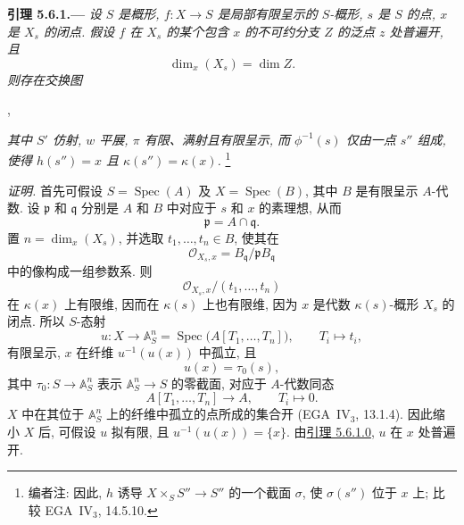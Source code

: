 
\medskip
{}\label{lem:sga3-VIB-5.6.1}%
\noindent\textbf{引理 5.6.1.---}
\emph{设 \(S\) 是概形, \(f:X\to S\) 是局部有限呈示的 \(S\)-概形,
\(s\) 是 \(S\) 的点, \(x\) 是 \(X_s\) 的闭点.
假设 \(f\) 在 \(X_s\) 的某个包含 \(x\) 的不可约分支
\(Z\) 的泛点 \(z\) 处普遍开, 且}
\[
  \dim_x(X_s)=\dim Z.
\]
\emph{则存在交换图}
\begin{center}
  \label{diag:sga3-VIB-5.6.1-statement}%
  \enspace,
\end{center}
\emph{其中 \(S'\) 仿射, \(w\) 平展,
\(\pi\) 有限、满射且有限呈示, 而 \(\phi^{-1}(s)\)
仅由一点 \(s''\) 组成, 使得 \(h(s'')=x\) 且 \(\kappa(s'')=\kappa(x)\).}%
\footnote{\label{note:sga3-VIB-41}编者注: 因此,
\(h\) 诱导 \(X\times_S S''\to S''\) 的一个截面 \(\sigma\),
使 \(\sigma(s'')\) 位于 \(x\) 上; 比较 EGA~IV\(_3\), 14.5.10.}

\emph{证明.}
首先可假设 \(S=\operatorname{Spec}(A)\) 及 \(X=\operatorname{Spec}(B)\),
其中 \(B\) 是有限呈示 \(A\)-代数.
设 \(\mathfrak p\) 和 \(\mathfrak q\) 分别是 \(A\) 和 \(B\)
中对应于 \(s\) 和 \(x\) 的素理想, 从而
\[
  \mathfrak p=A\cap\mathfrak q.
\]
置 \(n=\dim_x(X_s)\), 并选取 \(t_1,\ldots,t_n\in B\),
使其在
\[
  \mathcal O_{X_s,x}=B_{\mathfrak q}/\mathfrak p B_{\mathfrak q}
\]
中的像构成一组参数系. 则
\[
  \mathcal O_{X_s,x}/(t_1,\ldots,t_n)
\]
在 \(\kappa(x)\) 上有限维,
因而在 \(\kappa(s)\) 上也有限维,
因为 \(x\) 是代数 \(\kappa(s)\)-概形 \(X_s\) 的闭点.
所以 \(S\)-态射
\[
  u:X\longrightarrow\mathbb A^n_S
    =\operatorname{Spec}\bigl(A[T_1,\ldots,T_n]\bigr),
  \qquad T_i\longmapsto t_i,
\]
有限呈示, \(x\) 在纤维 \(u^{-1}(u(x))\) 中孤立, 且
\[
  u(x)=\tau_0(s),
\]
其中 \(\tau_0:S\to\mathbb A^n_S\) 表示 \(\mathbb A^n_S\to S\)
的零截面, 对应于 \(A\)-代数同态
\[
  A[T_1,\ldots,T_n]\longrightarrow A,\qquad T_i\longmapsto0.
\]
\(X\) 中在其位于 \(\mathbb A^n_S\) 上的纤维中孤立的点所成的集合开
(EGA~IV\(_3\), 13.1.4). 因此缩小 \(X\) 后,
可假设 \(u\) 拟有限, 且 \(u^{-1}(u(x))=\{x\}\).
由\hyperref[lem:sga3-VIB-5.6.1.0]{引理 5.6.1.0}, \(u\) 在 \(x\) 处普遍开.


